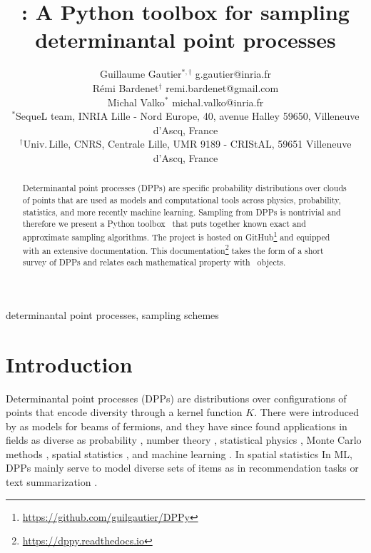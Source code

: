 \documentclass[twoside,11pt]{article}
\begin{document}
\title{\DPPy: A Python toolbox for sampling\\determinantal point processes}

\author{\name Guillaume Gautier$^{*,\dagger}$ \email g.gautier@inria.fr \\
       \name R\'emi Bardenet$^\dagger$ \email remi.bardenet@gmail.com \\
       \name Michal Valko$^*$ \email michal.valko@inria.fr\\
       \addr $^*$SequeL team, INRIA Lille - Nord Europe,  40, avenue Halley 59650, Villeneuve d'Ascq, France\\
       \addr $^\dagger$Univ.\,Lille, CNRS, Centrale Lille, UMR 9189 - CRIStAL, 59651 Villeneuve d'Ascq, France
}

\editor{}

\maketitle

\setcounter{footnote}{3}
\begin{abstract}%
  Determinantal point processes (DPPs) are specific probability distributions over clouds of points that are used as models and computational tools across physics, probability, statistics, and more recently machine learning. Sampling from DPPs is nontrivial and therefore we present a Python toolbox \DPPy\ that puts together known exact and approximate sampling algorithms.
  The project is hosted on GitHub\footnote{\url{https://github.com/guilgautier/DPPy}} and equipped with an extensive documentation.
  This documentation\footnote{\label{fn:docs}\url{https://dppy.readthedocs.io}} takes the form of a short survey of DPPs and relates each mathematical property with \DPPy\ objects.
\end{abstract}

\begin{keywords}determinantal point processes, sampling schemes\end{keywords}

\section{Introduction} %
\label{sec:introduction}

  Determinantal point processes (DPPs) are distributions over configurations of points that encode diversity through a kernel function $K$.
  There were introduced by \citet{Mac75} as models for beams of fermions, and they have since found applications in fields as diverse as probability \citep{Sos00, Kon05, HKPV06}, number theory \citep{RuSa96}, statistical physics \citep{PaBe11}, Monte Carlo methods \citep{BaHa16}, spatial statistics \citep{LaMoRu15}, and machine learning \citep{KuTa12}. In spatial statistics 
  In ML, DPPs mainly serve to model diverse sets of items as in recommendation tasks \citep{KaDeKo16, GaPaKo16} or text summarization \citep{DuBa18}.
\end{document}
